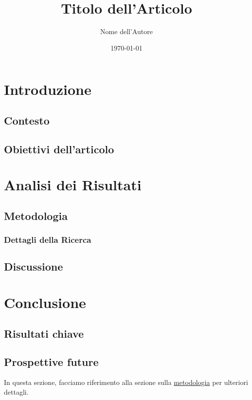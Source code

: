 \documentclass[a4paper,12pt]{book}
\title{Titolo dell'Articolo}
\author{Nome dell'Autore}
\date{\today}
\begin{document}
\maketitle

\tableofcontents
\clearpage

\chapter{Introduzione}

\section{Contesto}
\lipsum[1]  %

\section{Obiettivi dell'articolo}
\lipsum[2]  %

\chapter{Analisi dei Risultati}

\section{Metodologia}
\label{sec:metodologia}
\lipsum[3]  %

\subsection{Dettagli della Ricerca}
\lipsum[4]  %

\section{Discussione}
\lipsum[5]  %

\chapter{Conclusione}

\section{Risultati chiave}
\lipsum[6]  %

\section{Prospettive future}
In questa sezione, facciamo riferimento alla sezione sulla \hyperref[sec:metodologia]{metodologia} per ulteriori dettagli.

\lipsum[7]  %
\end{document}
